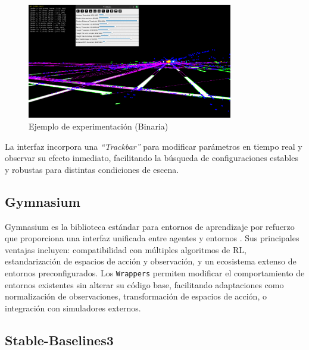 \begin{figure}[!ht]
	
		\includegraphics[width=0.8\textwidth]{img/reticule/experimentationBinary}
		\caption{Ejemplo de experimentación (Binaria)}
		\label{fig:experimentationBinary-teo}
	
\end{figure}


La interfaz incorpora una \emph{``Trackbar''} para modificar parámetros en tiempo real y observar su efecto inmediato,
facilitando la búsqueda de configuraciones estables y robustas para distintas condiciones de escena.

\subsection{Gymnasium}\label{sec:gymnasium}

Gymnasium es la biblioteca estándar para entornos de aprendizaje por refuerzo que proporciona una interfaz
unificada entre agentes y entornos \cite{towers2024gymnasium}. Sus principales ventajas incluyen:
compatibilidad con múltiples algoritmos de RL, estandarización de espacios de acción y observación,
y un ecosistema extenso de entornos preconfigurados. Los \texttt{Wrappers} permiten modificar el comportamiento
de entornos existentes sin alterar su código base, facilitando adaptaciones como normalización de observaciones,
transformación de espacios de acción, o integración con simuladores externos.

\subsection{Stable-Baselines3}\label{sec:stable-baselines3}

